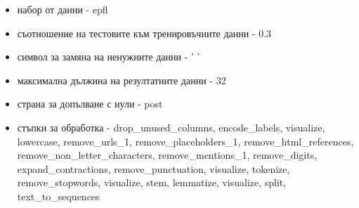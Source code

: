 \documentclass{article}
\begin{document}
\begin{itemize}
\begin{itemize}
\item набор от данни - epfl
\item съотношение на тестовите към тренировъчните данни - 0.3
\item символ за замяна на ненужните данни - ' '
\item максимална дължина на резултатните данни - 32
\item страна за допълване с нули - post
\item стъпки за обработка - drop\_unused\_columns, encode\_labels, visualize, lowercase, remove\_urls\_1,
remove\_placeholders\_1, remove\_html\_references, remove\_non\_letter\_characters, remove\_mentions\_1,
remove\_digits, expand\_contractions, remove\_punctuation, visualize, tokenize, remove\_stopwords, visualize,
stem, lemmatize, visualize, split, text\_to\_sequences
\end{itemize}


\end{itemize}
\end{document}
